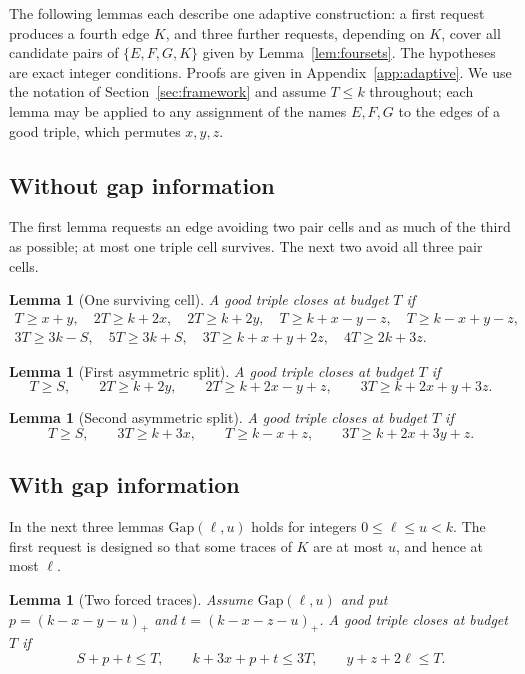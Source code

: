 \documentclass[11pt]{article}
\numberwithin{equation}{section}
\newtheorem{lemma}[theorem]{Lemma}
\theoremstyle{definition}
\theoremstyle{remark}
\newcommand{\Gap}{\mathrm{Gap}}
\begin{document}
The following lemmas each describe one adaptive construction: a first
request produces a fourth edge $K$, and three further requests,
depending on $K$, cover all candidate pairs of $\{E,F,G,K\}$ given by
Lemma~\ref{lem:foursets}. The hypotheses are exact integer conditions.
Proofs are given in Appendix~\ref{app:adaptive}. We use the notation of
Section~\ref{sec:framework} and assume $T\le k$ throughout; each lemma
may be applied to any assignment of the names $E,F,G$ to the edges of a
good triple, which permutes $x,y,z$.

\subsection{Without gap information}
The first lemma requests an edge avoiding two pair cells and as much of
the third as possible; at most one triple cell survives. The next two
avoid all three pair cells.

\begin{lemma}[One surviving cell]\label{lem:onecore}
A good triple closes at budget $T$ if
\begin{gather*}
 T\ge x+y,\quad 2T\ge k+2x,\quad 2T\ge k+2y,\quad
 T\ge k+x-y-z,\quad T\ge k-x+y-z,\\
 3T\ge3k-S,\quad 5T\ge3k+S,\quad 3T\ge k+x+y+2z,\quad 4T\ge2k+3z.
\end{gather*}
\end{lemma}

\begin{lemma}[First asymmetric split]\label{lem:splitA}
A good triple closes at budget $T$ if
\[
 T\ge S,\qquad 2T\ge k+2y,\qquad 2T\ge k+2x-y+z,\qquad 3T\ge k+2x+y+3z.
\]
\end{lemma}

\begin{lemma}[Second asymmetric split]\label{lem:splitB}
A good triple closes at budget $T$ if
\[
 T\ge S,\qquad 3T\ge k+3x,\qquad T\ge k-x+z,\qquad 3T\ge k+2x+3y+z.
\]
\end{lemma}

\subsection{With gap information}
In the next three lemmas $\Gap(\ell,u)$ holds for integers
$0\le\ell\le u<k$. The first request is designed so that some traces of
$K$ are at most $u$, and hence at most $\ell$.

\begin{lemma}[Two forced traces]\label{lem:gaptraces}
Assume $\Gap(\ell,u)$ and put $p=(k-x-y-u)_+$ and $t=(k-x-z-u)_+$.
A good triple closes at budget $T$ if
\[
 S+p+t\le T,\qquad k+3x+p+t\le3T,\qquad y+z+2\ell\le T.
\]
\end{lemma}
\end{document}
